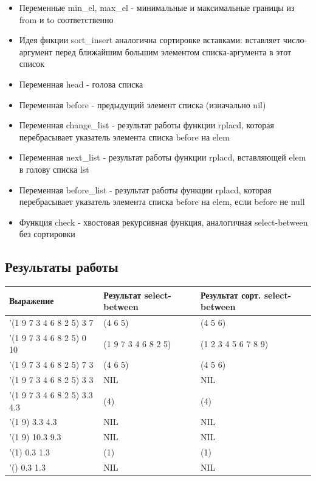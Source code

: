 \documentclass[a4paper,12pt]{article}
\begin{document}
	\begin{itemize}
		\item Переменные min\_el, max\_el - минимальные и максимальные границы из from и to соответственно
		\item Идея фнкции sort\_insert аналогична сортировке вставками: вставляет число-аргумент перед ближайшим большим элементом списка-аргумента в этот список
		\item Переменная head - голова списка
		\item Переменная before - предыдущий элемент списка (изначально nil)
		\item Переменная change\_list - результат работы функции rplacd, которая перебрасывает указатель элемента списка before на elem
		\item Переменная next\_list - результат работы функции rplacd, вставляющей elem в голову списка lst
		\item Переменная before\_list - результат работы функции rplacd, которая перебрасывает указатель элемента списка before на elem, если before не null
		\item Функция check - хвостовая рекурсивная функция, аналогичная select-between без сортировки
	\end{itemize}
	
	\subsection*{Результаты работы}
	
	\begin{table} [h!]
		\begin{center}
			\begin{tabular}{|l|l|l|}
				\hline
				{\bf  Выражение} & {\bf Результат select-between} & {\bf Результат сорт. select-between}  \\
				\hline
				{'(1 9 7 3 4 6 8 2 5) 3 7} & (4 6 5) & (4 5 6)\\
				\hline
				{'(1 9 7 3 4 6 8 2 5) 0 10} & (1 9 7 3 4 6 8 2 5) & (1 2 3 4 5 6 7 8 9)\\
				\hline
				{'(1 9 7 3 4 6 8 2 5) 7 3} & (4 6 5) & (4 5 6)\\
				\hline
				{'(1 9 7 3 4 6 8 2 5) 3 3} & NIL & NIL\\
				\hline
				{'(1 9 7 3 4 6 8 2 5) 3.3 4.3} & (4) & (4)\\
				\hline
				{'(1 9) 3.3 4.3} & NIL & NIL \\
				\hline
				{'(1 9) 10.3 9.3} & NIL & NIL \\
				\hline
				{'(1) 0.3 1.3} & (1) & (1) \\
				\hline
				{'()  0.3 1.3} & NIL & NIL \\
				\hline
			\end{tabular}  
			\label{m6}
		\end{center}
	\end{table}
	
\end{document}
